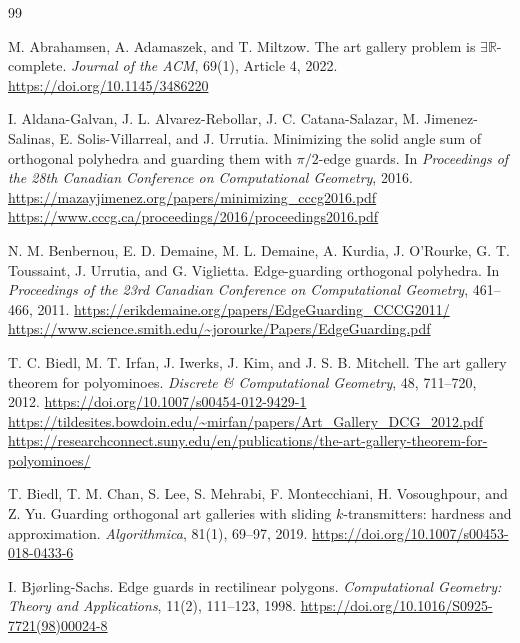 \documentclass[11pt]{article}
\begin{document}
\begin{thebibliography}{99}

M. Abrahamsen, A. Adamaszek, and T. Miltzow.
\newblock The art gallery problem is $\exists\mathbb{R}$-complete.
\newblock \emph{Journal of the ACM}, 69(1), Article 4, 2022.
\newblock \url{https://doi.org/10.1145/3486220}

I. Aldana-Galvan, J. L. Alvarez-Rebollar, J. C. Catana-Salazar,
M. Jimenez-Salinas, E. Solis-Villarreal, and J. Urrutia.
\newblock Minimizing the solid angle sum of orthogonal polyhedra and guarding
them with $\pi/2$-edge guards.
\newblock In \emph{Proceedings of the 28th Canadian Conference on
Computational Geometry}, 2016.
\newblock \url{https://mazayjimenez.org/papers/minimizing_cccg2016.pdf}
\newblock \url{https://www.cccg.ca/proceedings/2016/proceedings2016.pdf}

N. M. Benbernou, E. D. Demaine, M. L. Demaine, A. Kurdia,
J. O'Rourke, G. T. Toussaint, J. Urrutia, and G. Viglietta.
\newblock Edge-guarding orthogonal polyhedra.
\newblock In \emph{Proceedings of the 23rd Canadian Conference on Computational Geometry}, 461--466, 2011.
\newblock \url{https://erikdemaine.org/papers/EdgeGuarding_CCCG2011/}
\newblock \url{https://www.science.smith.edu/~jorourke/Papers/EdgeGuarding.pdf}

T. C. Biedl, M. T. Irfan, J. Iwerks, J. Kim, and J. S. B. Mitchell.
\newblock The art gallery theorem for polyominoes.
\newblock \emph{Discrete \& Computational Geometry}, 48, 711--720, 2012.
\newblock \url{https://doi.org/10.1007/s00454-012-9429-1}
\newblock \url{https://tildesites.bowdoin.edu/~mirfan/papers/Art_Gallery_DCG_2012.pdf}
\newblock \url{https://researchconnect.suny.edu/en/publications/the-art-gallery-theorem-for-polyominoes/}

T. Biedl, T. M. Chan, S. Lee, S. Mehrabi, F. Montecchiani, H. Vosoughpour, and Z. Yu.
\newblock Guarding orthogonal art galleries with sliding $k$-transmitters: hardness and approximation.
\newblock \emph{Algorithmica}, 81(1), 69--97, 2019.
\newblock \url{https://doi.org/10.1007/s00453-018-0433-6}

I. Bj{\o}rling-Sachs.
\newblock Edge guards in rectilinear polygons.
\newblock \emph{Computational Geometry: Theory and Applications}, 11(2), 111--123, 1998.
\newblock \url{https://doi.org/10.1016/S0925-7721(98)00024-8}


\end{thebibliography}
\end{document}
